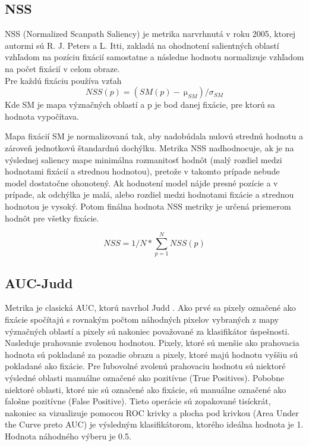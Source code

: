 \subsection{NSS}
NSS (Normalized Scanpath Saliency) je metrika narvrhnutá v roku 2005, ktorej autormi sú R. J. Peters a L. Itti, zakladá na ohodnotení salientných oblastí vzhľadom na pozíciu fixácií samostatne a následne hodnotu normalizuje vzhľadom na počet fixácií v celom obraze\cite{metrics-1}.
\\
Pre každú fixáciu používa vzťah
  \begin{equation}
    NSS(p) =  (SM(p)-\SI{}{\micro}_{SM}) / 	\sigma_{SM}
  \end{equation}
Kde SM je mapa význačných oblastí a p je bod danej fixácie, pre ktorú sa hodnota vypočítava.

Mapa fixácií SM je normalizovaná tak, aby nadobúdala nulovú strednú hodnotu a zároveň jednotkovú štandardnú dochýlku.
Metrika NSS nadhodnocuje, ak je na výslednej saliency mape minimálna rozmanitosť hodnôt (malý rozdiel medzi hodnotami fixácií a strednou hodnotou), pretože v takomto prípade nebude model dostatočne ohonotený.
Ak hodnotení model nájde presné pozície a v prípade, ak odchýlka je malá, alebo rozdiel medzi hodnotami fixácie a strednou hodnotou je vysoký.
Potom finálna hodnota NSS metriky je určená priemerom hodnôt pre všetky fixácie\cite{metrics-1}.

\begin{equation}
  NSS = 1/N * \sum_{p=1}^{N}NSS(p)
\end{equation}

\subsection{AUC-Judd}
Metrika je clasická AUC, ktorú navrhol Judd \cite{auc-judd}.
Ako prvé sa pixely označené ako fixácie spočítajú s rovnakým počtom náhodných pixelov vybraných z mapy význačných oblastí a pixely sú nakoniec považované za klasifikátor úspešnosti.
Nasleduje prahovanie zvolenou hodnotou.
Pixely, ktoré sú menšie ako prahovacia hodnota sú pokladané za pozadie obrazu a pixely, ktoré majú hodnotu vyššiu sú pokladané ako fixácie.
Pre ľubovolné zvolenú prahovaciu hodnotu sú niektoré výsledné oblasti manuálne označené ako pozitívne (True Positives).
Pobobne niektoré oblasti, ktoré nie sú označené ako fixácie, sú manuálne označené ako falošne pozitívne (False Positive).
Tieto operácie sú zopakované tisíckrát, nakoniec sa vizualizuje pomocou ROC krivky a plocha pod krivkou (Area Under the Curve preto AUC) je výsledným klasifikátorom, ktorého ideálna hodnota je 1.
Hodnota náhodného výberu je 0.5.

